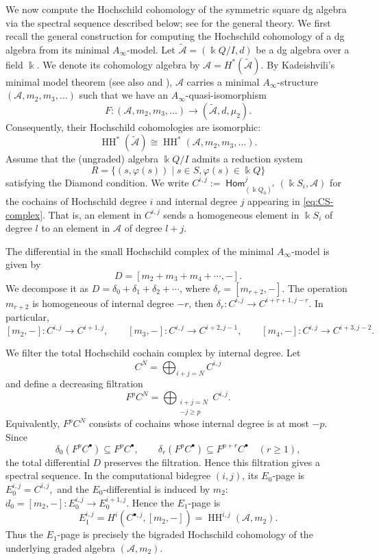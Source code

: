 \documentclass[a4paper, reqno, 11pt]{amsart}
\theoremstyle{definition}
\newcommand{\opname}[1]{\operatorname{\mathsf{#1}}}
\newcommand{\Hom}{\opname{Hom}}
\begin{document}
We now compute the Hochschild cohomology of the symmetric square dg algebra via
the spectral sequence described below; see \cite[Chapter~5]{Weibel1994} for the
general theory. We first recall the general construction
for computing the Hochschild cohomology of a dg algebra from its minimal
\(A_\infty\)-model. Let \(\widetilde{\mathcal A}=(\Bbbk Q/I, d)\) be a dg algebra over a field \(\Bbbk\). We denote its cohomology algebra by $\mathcal A=H^\ast(\widetilde{\mathcal A}).$ By Kadeishvili's minimal model theorem
\cite{Kadeishvili1980} 
(see also \cite[Section~3.3]{Keller2001} and
\cite[Theorem~1]{Petersen2020}), \(\mathcal A\) carries a minimal
\(A_\infty\)-structure \((\mathcal A,m_2,m_3,\ldots)\)
such that we have an \(A_\infty\)-quasi-isomorphism
\[
F:(\mathcal A,m_2,m_3,\ldots)\longrightarrow (\widetilde{\mathcal A},d,\mu_2).
\] Consequently, their Hochschild cohomologies are isomorphic:
\[
\operatorname{HH}^\ast(\widetilde{\mathcal{A}})
\cong
\operatorname{HH}^\ast(\mathcal A,m_2,m_3,\ldots).
\]
Assume that the (ungraded) algebra $\Bbbk Q/I$ admits a reduction system $$R =\{(s, \varphi(s)) \mid s \in S, \varphi(s) \in \Bbbk Q\}$$ satisfying the Diamond condition. We write
\(
C^{i,j}:=\Hom_{(\Bbbk Q_0)^e}^{j}(\Bbbk S_i,\mathcal A)
\)
for the cochains of Hochschild degree \(i\) and internal degree \(j\) appearing in \eqref{eq:CS-complex}. That is, an element in \(C^{i,j}\) sends a homogeneous element in \(\Bbbk S_i\) of  degree \(l\) to an element in \(\mathcal A\) of  degree \(l+j\).

The differential in the small Hochschild complex of the minimal $A_\infty$-model is given by
\[
D=[m_2+m_3+m_4+\cdots,-].
\]
We decompose it as
\(
D=\delta_0+\delta_1+\delta_2+\cdots
\), where \(\delta_r=[m_{r+2},-].
\) The operation \(m_{r+2}\) is homogeneous of internal degree \(-r\), then
\(
\delta_r:C^{i,j}\longrightarrow C^{i+r+1,j-r}.
\)
In particular,
\[
[m_2,-]:C^{i,j}\to C^{i+1,j},\qquad
[m_3,-]:C^{i,j}\to C^{i+2,j-1},\qquad
[m_4,-]:C^{i,j}\to C^{i+3,j-2}.
\]

We filter the total Hochschild cochain complex by internal degree. Let
\[
C^N=\bigoplus_{i+j=N}C^{i,j}
\]
and define a decreasing filtration
\[
F^pC^N=\bigoplus_{\substack{i+j=N\\ -j\ge p}}C^{i,j}.
\]
Equivalently, \(F^pC^N\) consists of cochains whose internal degree is at most \(-p\). Since
\[
\delta_0(F^pC^\bullet)\subseteq F^pC^\bullet,\qquad
\delta_r(F^pC^\bullet)\subseteq F^{p+r}C^\bullet\quad (r\ge 1),
\]
the total differential \(D\) preserves the filtration. Hence this filtration gives a spectral sequence. In the computational bidegree \((i,j)\), its \(E_0\)-page is \(E_0^{i,j}=C^{i,j},\) and the \(E_0\)-differential is induced by \(m_2\): \(d_0=[m_2,-]:E_0^{i,j}\longrightarrow E_0^{i+1,j}.\)
Hence the \(E_1\)-page is
\[
E_1^{i,j}
=
H^i(C^{\bullet,j},[m_2,-])
=
\operatorname{HH}^{i,j}(\mathcal A,m_2).
\]
Thus the \(E_1\)-page is precisely the bigraded Hochschild cohomology of the
underlying graded algebra \((\mathcal A,m_2)\).
\end{document}
